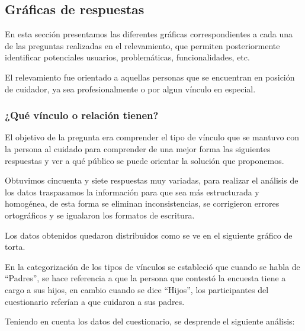 \documentclass[a4paper,12pt]{article}
\begin{document}
    \subsection{Gráficas de respuestas}
    \par En esta sección presentamos las diferentes gráficas correspondientes a cada una de las preguntas realizadas en el relevamiento, que permiten posteriormente identificar potenciales usuarios, problemáticas, funcionalidades, etc.
    \par El relevamiento fue orientado a aquellas personas que se encuentran en posición de cuidador, ya sea profesionalmente o por algun vínculo en especial.
    \subsubsection{¿Qué vínculo o relación tienen?}
    \par El objetivo de la pregunta era comprender el tipo de vínculo que se mantuvo con la persona al cuidado para comprender de una mejor forma las siguientes respuestas y ver a qué público se puede orientar la solución que proponemos.
    \par Obtuvimos cincuenta y siete respuestas muy variadas, para realizar el análisis de los datos traspasamos la información para que sea más estructurada y homogénea, de esta forma se eliminan inconsistencias, se corrigieron errores ortográficos y se igualaron los formatos de escritura.
    \par Los datos obtenidos quedaron distribuidos como se ve en el siguiente gráfico de torta. \newline
    \newline
    \par En la categorización de los tipos de vínculos se estableció que cuando se habla de “Padres”, se hace referencia a que la persona que contestó la encuesta tiene a cargo a sus hijos, en cambio cuando se dice “Hijos”, los participantes del cuestionario referían a que cuidaron a sus padres.
    \par Teniendo en cuenta los datos del cuestionario, se desprende el siguiente análisis:
\end{document}
